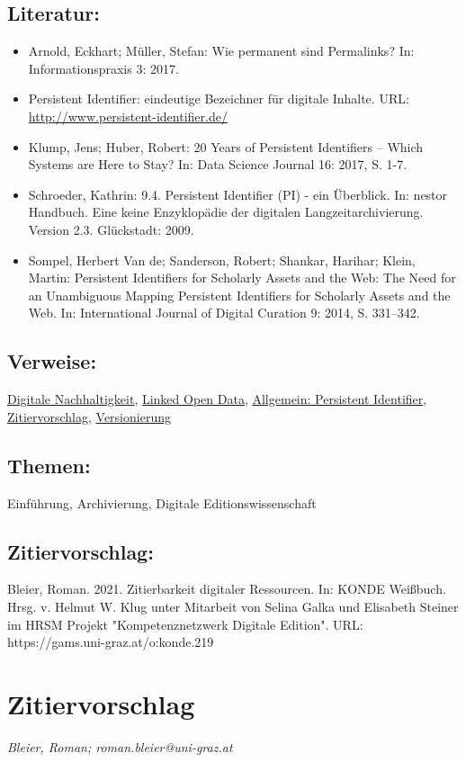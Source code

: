 \documentclass{article}
\begin{document}
        \subsection*{Literatur:}\begin{itemize}\item Arnold, Eckhart; Müller, Stefan: Wie permanent sind Permalinks? In: Informationspraxis 3: 2017.\item Persistent Identifier: eindeutige Bezeichner für digitale Inhalte. URL: \url{http://www.persistent-identifier.de/}\item Klump, Jens; Huber, Robert: 20 Years of Persistent Identifiers – Which Systems are Here to Stay? In: Data Science Journal 16: 2017, S. 1-7.\item Schroeder, Kathrin: 9.4. Persistent Identifier (PI) - ein Überblick. In: nestor Handbuch. Eine keine Enzyklopädie der digitalen Langzeitarchivierung. Version 2.3. Glückstadt: 2009.\item Sompel, Herbert Van de; Sanderson, Robert; Shankar, Harihar; Klein, Martin: Persistent Identifiers for Scholarly Assets and the Web: The Need for an Unambiguous Mapping Persistent Identifiers for Scholarly Assets and the Web. In: International Journal of Digital Curation 9: 2014, S. 331–342.\end{itemize}\subsection*{Verweise:}\href{https://gams.uni-graz.at/o:konde.6}{Digitale Nachhaltigkeit}, \href{https://gams.uni-graz.at/o:konde.8}{Linked Open Data}, \href{https://gams.uni-graz.at/o:konde.12}{Allgemein: Persistent Identifier}, \href{https://gams.uni-graz.at/o:konde.220}{Zitiervorschlag}, \href{https://gams.uni-graz.at/o:konde.14}{Versionierung}\subsection*{Themen:}Einführung, Archivierung, Digitale Editionswissenschaft\subsection*{Zitiervorschlag:}Bleier, Roman. 2021. Zitierbarkeit digitaler Ressourcen. In: KONDE Weißbuch. Hrsg. v. Helmut W. Klug unter Mitarbeit von Selina Galka und Elisabeth Steiner im HRSM Projekt "Kompetenznetzwerk Digitale Edition". URL: https://gams.uni-graz.at/o:konde.219\newpage\section*{Zitiervorschlag} \emph{Bleier, Roman; roman.bleier@uni-graz.at }\\
        
\end{document}
